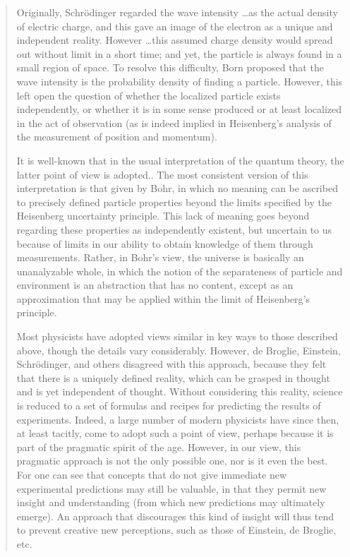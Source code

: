 \documentclass[11pt]{memoir}
\begin{document}
\begin{quote}
Originally, Schrödinger regarded the wave intensity \ldots as the actual
density of electric charge, and this gave an image of the electron as a
unique and independent reality. However \ldots this assumed charge
density would spread out without limit in a short time; and yet, the
particle is always found in a small region of space. To resolve this
difficulty, Born proposed that the wave intensity is the probability
density of finding a particle. However, this left open the question of
whether the localized particle exists independently, or whether it is in
some sense produced or at least localized in the act of observation (as
is indeed implied in Heisenberg's analysis of the measurement of
position and momentum).

It is well-known that in the usual interpretation of the quantum theory,
the latter point of view is adopted.. The most consistent version of
this interpretation is that given by Bohr, in which no meaning can be
ascribed to precisely defined particle properties beyond the limits
specified by the Heisenberg uncertainty principle. This lack of meaning
goes beyond regarding these properties as independently existent, but
uncertain to us because of limits in our ability to obtain knowledge of
them through measurements. Rather, in Bohr's view, the universe is
basically an unanalyzable whole, in which the notion of the separateness
of particle and environment is an abstraction that has no content,
except as an approximation that may be applied within the limit of
Heisenberg's principle.

Most physicists have adopted views similar in key ways to those
described above, though the details vary considerably. However, de
Broglie, Ein\-stein, Schrö\-dinger, and others disagreed with this approach,
because they felt that there is a uniquely defined reality, which can be
grasped in thought and is yet independent of thought. Without
considering this reality, science is reduced to a set of formulas and
recipes for predicting the results of experiments. Indeed, a large
number of modern physicists have since then, at least tacitly, come to
adopt such a point of view, perhaps because it is part of the pragmatic
spirit of the age. However, in our view, this pragmatic approach is not
the only possible one, nor is it even the best. For one can see that
concepts that do not give immediate new experimental predictions may
still be valuable, in that they permit new insight and understanding
(from which new predictions may ultimately emerge). An approach that
discourages this kind of insight will thus tend to prevent creative new
perceptions, such as those of Einstein, de Broglie, etc.


\end{quote}
\end{document}

